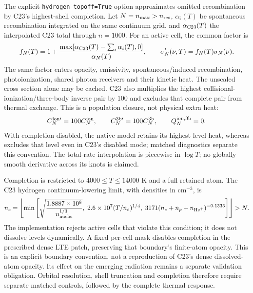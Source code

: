\documentclass[10pt,a4paper]{article}
\begin{document}
The explicit \texttt{hydrogen\_topoff=True} option approximates omitted
recombination by C23's highest-shell completion. Let $N=n_{\max}>n_{\rm res}$,
$\alpha_i(T)$ be spontaneous recombination integrated on the same continuum
grid, and $\alpha_{\rm C23}(T)$ the interpolated C23 total through $n=1000$.
For an active cell, the common factor is
\begin{equation}
 f_N(T)=1+\frac{\max[\alpha_{\rm C23}(T)-\sum_i\alpha_i(T),0]}{\alpha_N(T)},
 \qquad \sigma_N'(\nu,T)=f_N(T)\sigma_N(\nu).
 \label{eq:hydrogen_completion}
\end{equation}
The same factor enters opacity, emissivity, spontaneous/induced
recombination, photoionization, shared photon receivers and their kinetic
heat. The unscaled cross section alone may be cached. C23 also multiplies
the highest collisional-ionization/three-body inverse pair by 100 and
excludes that complete pair from thermal exchange. This is a population
closure, not physical extra heat:
\begin{equation}
 C_N^{{\rm ion}\prime}=100C_N^{\rm ion},\qquad
 C_N^{{\rm 3b}\prime}=100C_N^{\rm 3b},\qquad
 Q_N^{\rm ion,3b}=0.
 \label{eq:hydrogen_completion_collisions}
\end{equation}
With completion disabled, the native
model retains its highest-level heat, whereas  excludes
that level even in C23's disabled mode; matched diagnostics separate this
convention. The total-rate interpolation is piecewise in $\log T$;
no globally smooth derivative across its knots is claimed.

Completion is restricted to $4000\leq T\leq14000$ K and a full retained atom.
The C23 hydrogen continuum-lowering limit, with densities in cm$^{-3}$, is
\begin{equation}
 n_c=\left\lfloor\min\left[
 \sqrt{\frac{1.8887\times10^8}{n_{\rm nuclei}^{1/3}}},\;
 2.6\times10^7(T/n_e)^{1/4},\;
 3171(n_e+n_p+n_{{\rm He}^+})^{-0.1333}\right]\right\rfloor>N.
 \label{eq:hydrogen_completion_domain}
\end{equation}
The implementation rejects active cells that violate this condition;
it does not dissolve levels dynamically. A fixed per-cell mask disables
completion in the prescribed dense LTE patch, preserving that boundary's
finite-atom opacity. This is an explicit boundary convention, not a
reproduction of C23's dense dissolved-atom opacity. Its effect on the
emerging radiation remains a separate validation obligation.
Orbital resolution, shell truncation and completion therefore require
separate matched controls, followed by the complete thermal response.
\end{document}
